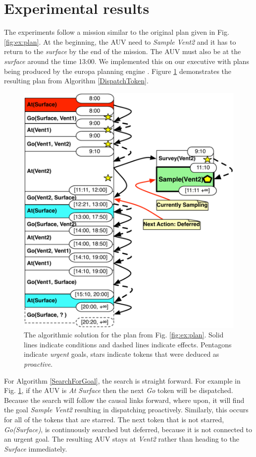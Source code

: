 \section{Experimental results}
\label{sec:exp}

The experiments follow a mission similar to the original plan given in
Fig. \ref{fig:ex:plan}. At the beginning, the AUV need to {\em Sample
  Vent2} and it has to return to the {\em surface} by the end of the
mission. The AUV must also be at the {\em surface} around the time 13:00. We
implemented this on our executive with plans being produced by the
europa planning engine \cite{frank2003}. Figure \ref{fig:ex:mixed1} 
demonstrates the resulting plan from Algorithm \ref{DispatchToken}.

\begin{figure}[!htbp]
  \centering
  \includegraphics[width=0.8\columnwidth]{figs/example_MixedInitial}
  \caption{\small The algorithmic solution for the plan from
    Fig. \ref{fig:ex:plan}. Solid lines indicate conditions and
    dashed lines indicate effects. Pentagons indicate {\em urgent}
    goals, stars indicate tokens that were deduced as {\em proactive}.}
  \label{fig:ex:mixed1}
\end{figure}

For Algorithm \ref{SearchForGoal}, the search is straight forward. For
example in Fig. \ref{fig:ex:mixed1}, if the AUV is {\em At Surface} then
the next {\em Go} token will be dispatched. Because the search will
follow the causal links forward, where upon, it will find the goal
{\em Sample Vent2} resulting in dispatching proactively.  Similarly,
this occurs for all of the tokens that are starred. The next token that is
not starred, {\em Go(Surface)}, is continuously searched but deferred,
because it is not connected to an urgent goal. The resulting AUV stays 
at {\em Vent2} rather than heading to the {\em Surface} immediately.

